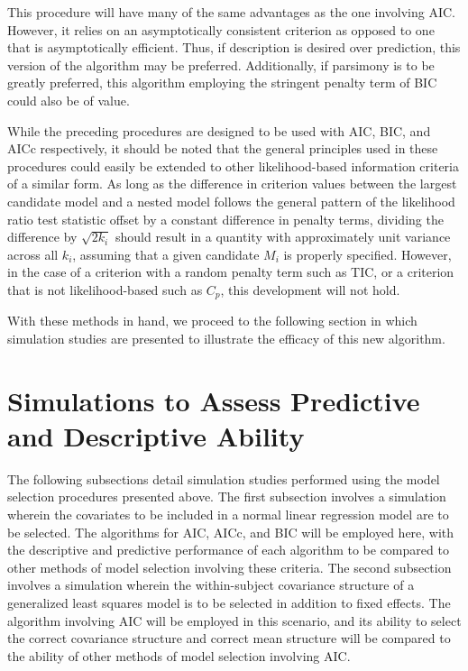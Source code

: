 		This procedure will have many of the same advantages as the one involving AIC. However, it relies on an asymptotically consistent criterion as opposed to one that
		is asymptotically efficient. Thus, if description is desired over prediction, this version of the algorithm may be preferred. Additionally, if parsimony
		is to be greatly preferred, this algorithm employing the stringent penalty term of BIC could also be of value.

		While the preceding procedures are designed to be used with AIC, BIC, and AICc respectively, it should be
		noted that the general principles used in these procedures could easily be extended to other likelihood-based information criteria of a similar form. As long
		as the difference in criterion values between the largest candidate model and a nested model follows the general pattern of the likelihood ratio test statistic
		offset by a constant difference in penalty terms, dividing the difference by $\sqrt{2k_i}$ should result in a quantity with approximately unit variance across
		all $k_i$, assuming that a given candidate $M_i$ is properly specified. However, in the case of a criterion with a random penalty term such as TIC, or a criterion that
		is not likelihood-based such as $C_p$, this development will not hold.
		
		With these methods in hand, we proceed to the following section in which simulation studies are presented to illustrate the efficacy of this new algorithm.

		\section{Simulations to Assess Predictive and Descriptive Ability} \label{sec:sim_model_select}

		The following subsections detail simulation studies performed using the model selection procedures presented above. The first subsection involves a simulation wherein
		the covariates to be included in a normal linear regression model are to be selected. The algorithms for AIC, AICc, and BIC will be employed here, with the
		descriptive and predictive performance of each algorithm to be compared to other methods of model selection involving these criteria. The second subsection
		involves a simulation wherein the within-subject covariance structure of a generalized least squares model is to be selected in addition to fixed effects. The algorithm involving AIC will be
		employed in this scenario, and its ability to select the correct covariance structure and correct mean structure will be compared to the ability of other methods of model selection involving
		AIC.

